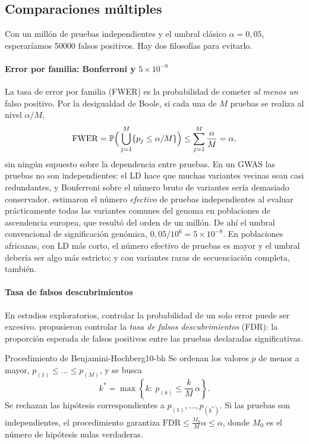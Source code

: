 \begin{figure}[t]
\label{fig:10-qq}
\end{figure}

\subsection{Comparaciones múltiples}

Con un millón de pruebas independientes y el umbral clásico $\alpha=0{,}05$, esperaríamos \num{50000} falsos positivos. Hay dos filosofías para evitarlo.

\paragraph{Error por familia: Bonferroni y $5\times10^{-8}$} La tasa de error por familia (FWER) es la probabilidad de cometer \emph{al menos un} falso positivo. Por la desigualdad de Boole, si cada una de $M$ pruebas se realiza al nivel $\alpha/M$,
\begin{equation}\label{eq:10-bonferroni}
\mathrm{FWER} = \mathbb{P}\Big(\bigcup_{j=1}^{M}\{p_j\le \alpha/M\}\Big) \le \sum_{j=1}^{M}\frac{\alpha}{M} = \alpha ,
\end{equation}
sin ningún supuesto sobre la dependencia entre pruebas. En un GWAS las pruebas no son independientes: el LD hace que muchas variantes vecinas sean casi redundantes, y Bonferroni sobre el número bruto de variantes sería demasiado conservador. \textcite{c10-peer2008} estimaron el número \emph{efectivo} de pruebas independientes al evaluar prácticamente todas las variantes comunes del genoma en poblaciones de ascendencia europea, que resultó del orden de un millón. De ahí el umbral convencional de significación genómica, $0{,}05/10^6=5\times10^{-8}$. En poblaciones africanas, con LD más corto, el número efectivo de pruebas es mayor y el umbral debería ser algo más estricto; y con variantes raras de secuenciación completa, también.

\paragraph{Tasa de falsos descubrimientos} En estudios exploratorios, controlar la probabilidad de un solo error puede ser excesivo. \textcite{c10-benjamini1995} propusieron controlar la \emph{tasa de falsos descubrimientos} (FDR): la proporción esperada de falsos positivos entre las pruebas declaradas significativas.

\begin{teorema}{Procedimiento de Benjamini-Hochberg}{10-bh}
Se ordenan los valores $p$ de menor a mayor, $p_{(1)}\le\dots\le p_{(M)}$, y se busca
\begin{equation}\label{eq:10-bh}
k^\ast = \max\left\{k:\ p_{(k)} \le \frac{k}{M}\,\alpha\right\}.
\end{equation}
Se rechazan las hipótesis correspondientes a $p_{(1)},\dots,p_{(k^\ast)}$. Si las pruebas son independientes, el procedimiento garantiza $\mathrm{FDR}\le \frac{M_0}{M}\alpha\le\alpha$, donde $M_0$ es el número de hipótesis nulas verdaderas.
\end{teorema}


